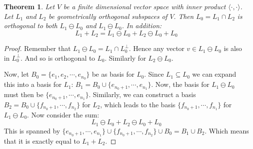 \documentclass[12pt, a4paper]{article}
\newtheorem{theorem}{Theorem}[section]
\numberwithin{equation}{section}
\begin{document}
\begin{theorem}
\label{sum_split_three_way}
Let $V$ be a finite dimensional vector space with inner product $\langle\cdot,\cdot\rangle$. Let $L_1$ and $L_2$ be geometrically orthogonal subspaces of $V$. Then $L_0=L_1\cap L_2$ is orthogonal to both $L_1\ominus L_0$ and $L_1\ominus L_0$. In addition:
\begin{equation}
L_1+L_2=L_1\ominus L_0+L_2\ominus L_0+L_0
\end{equation}
\end{theorem}
\begin{proof}
Remember that $L_1\ominus L_0=L_1\cap L_0^\perp$. Hence any vector $v\in L_1\ominus L_0$ is also in $L_0^\perp$. And so is orthogonal to $L_0$. Similarly for $L_2\ominus L_0$.

Now, let $B_0=\{e_1,e_2,\cdots,e_{n_0}\}$ be as basis for $L_0$. Since $L_1\subseteq L_0$ we can expand this into a basis for $L_1$: $B_1=B_0\cup\{e_{n_0+1},\cdots,e_{n_1}\}$. Now, the basis for $L_1\ominus L_0$ must then be $\{e_{n_0+1},\cdots,e_{n_1}\}$. Similarly, we can construct a basis $B_2=B_0\cup\{f_{n_0+1},\cdots,f_{n_2}\}$ for $L_2$, which leads to the basis $\{f_{n_0+1},\cdots,f_{n_1}\}$ for $L_1\ominus L_0$. Now consider the sum:
\begin{equation}
L_1\ominus L_0+L_2\ominus L_0+L_0
\end{equation}
This is spanned by $\{e_{n_0+1},\cdots,e_{n_1}\}\cup\{f_{n_0+1},\cdots,f_{n_2}\}\cup B_0=B_1\cup B_2$. Which means that it is exactly equal to $L_1+L_2$.
\end{proof}
\end{document}
